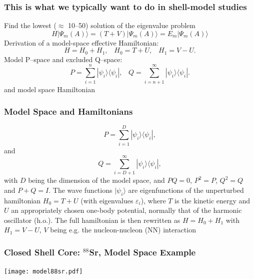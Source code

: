 \documentclass[compress]{beamer}
\newcommand*{\ket}[1]{|#1\rangle}
\newcommand*{\bra}[1]{\langle#1|}
\begin{document}
\frame
{
\frametitle{This is what we typically want to do in shell-model studies}
\begin{small}
{\scriptsize
Find the lowest ($\approx$ 10--50) solution
of the eigenvalue problem
%
\[
H\ket{\Psi_m(A)} = ( T + V) \ket{\Psi_m(A)} = E_m \ket{\Psi_m(A)}
\]
%
Derivation of a model-space effective Hamiltonian:
%
\[
H = H_{0} + H_1,\;\;\; H_{0} = T + U,\;\;\; H_1  = V - U.
\]
%
Model P--space and excluded Q--space:
%
\[
P = \sum_{i = 1}^n \ket{\psi_i} \bra{\psi_i} ,
\;\;\;
Q = \sum_{i = n+1}^{\infty} \ket{\psi_i} \bra{\psi_i}.
\]
and model space Hamiltonian
%
\begin{center}
\fbox{\parbox{10cm}{
%
\[
PH_{eff}P\ket{\Psi_m}
= P\left (\widetilde{H}_0 + (H_1)_{eff} \right ) P \ket{\Psi_m}
= E_m P\ket{\Psi_m}
\]
}}
\end{center}
}
\end{small}
}




\frame
{
\frametitle{Model Space and Hamiltonians}
\begin{small}
{\scriptsize
\[
    P=\sum_{i=1}^{D} \ket{\psi_i}\bra{\psi_i},
\]
and
\[
    Q=\sum_{i=D+1}^{\infty} \ket{\psi_i}\bra{\psi_i},
\]
with $D$ being the dimension of the model space, and $PQ=0$, $P^2 =P$,
$Q^2 =Q$ and $P+Q=I$. The wave functions $\ket{\psi_i}$ are eigenfunctions
of the unperturbed hamiltonian $H_0 = T+U$ (with eigenvalues
$\varepsilon_i$), where $T$ is the kinetic
energy and $U$ an appropriately chosen one-body potential, normally
that of the
harmonic oscillator (h.o.). The full hamiltonian
is then rewritten as $H=H_0 +H_1$ with $H_1=V-U$, $V$ being e.g. the
nucleon-nucleon (NN) interaction
}
\end{small}
}

\frame
 {
  \frametitle{Closed Shell {\bf Core}: $^{88}$Sr, Model Space Example}
 \vspace{-2cm}
 \begin{center}
 \texttt{[image: model88sr.pdf]}
 \end{center}
 }
\end{document}
